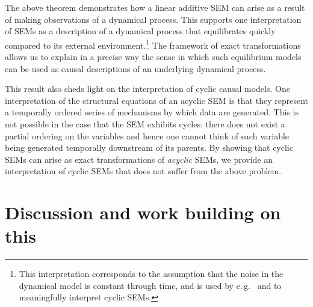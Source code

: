 The above theorem demonstrates how a linear additive SEM can arise as a result of making observations of a dynamical process.
This supports one interpretation of SEMs as a description of a dynamical process that equilibrates quickly compared to its external environment.\footnote{This interpretation corresponds to the assumption that the noise in the dynamical model is constant through time, and is used by e.\,g.\ \cite{lacerda2012discovering,Mooij_et_al_NIPS_11,hyttinen2012learning,mooij2013ode} and \cite{mooij2013cyclic} to meaningfully interpret cyclic SEMs.}
The framework of exact transformations allows us to explain in a precise way the sense in which such equilibrium models can be used as causal descriptions of an underlying dynamical process.

This result also sheds light on the interpretation of cyclic causal models.
One interpretation of the structural equations of an acyclic SEM is that they represent a temporally ordered series of mechanisms by which data are generated.
This is not possible in the case that the SEM exhibits cycles: there does not exist a partial ordering on the variables and hence one cannot think of each variable being generated temporally downstream of its parents.
By showing that cyclic SEMs can arise as exact transformations of \emph{acyclic} SEMs, we provide an interpretation of cyclic SEMs that does not suffer from the above problem.




\section{Discussion and work building on this}










































